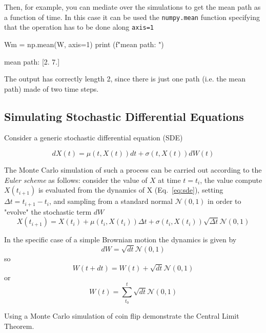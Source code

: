 \documentclass[12pt,a4paper]{book}
\begin{document}
Then, for example, you can mediate over the simulations to get the mean path as a function of time. In this case it can be used the \texttt{numpy.mean} function specifying that the operation has to be done along \texttt{axis=1}

\begin{ipython}
Wm = np.mean(W, axis=1)
print (f"mean path: ")
\end{ipython}
\begin{ioutput}
mean path: 
[2. 7.]
\end{ioutput}

The output has correctly length 2, since there is just one path (i.e. the mean path) made of two time steps.

\subsection{Simulating Stochastic Differential Equations}

Consider a generic stochastic differential equation (SDE)

\begin{equation}
dX(t) = \mu(t,X(t))dt + \sigma(t,X(t))dW(t)
\label{eq:sde}
\end{equation}

The Monte Carlo simulation of such a process can be carried out according to the \emph{Euler scheme} as follows: consider the value of $X$ at time $t=t_i$, the value compute $X(t_{i+1})$ is evaluated from the dynamics of X (Eq.~\ref{eq:sde}), setting $\Delta t = t_{i+1} - t_{i}$, and sampling from a standard normal $\mathcal{N}(0,1)$ in order to "evolve" the stochastic term $dW$
\begin{equation}
X(t_{i+1}) = X(t_i) + \mu(t_i,X(t_i))\Delta t + \sigma(t_i,X(t_i))\sqrt{\Delta t}\mathcal{N}(0,1)
\end{equation}

In the specific case of a simple Brownian motion the dynamics is given by
\begin{equation}
dW = \sqrt{dt}\mathcal{N}(0,1)
\end{equation}
so
\begin{equation}
W(t+dt) = W(t) + \sqrt{dt}\mathcal{N}(0,1)
\end{equation}
or
\begin{equation}
W(t) = \sum_{t_0}^{t} \sqrt{dt}\mathcal{N}(0,1)
\end{equation}

\begin{question}[subtitle=Central Limit Theorem (\texttt{python})]
Using a Monte Carlo simulation of coin flip demonstrate the Central Limit Theorem.
\end{question}
\end{document}
